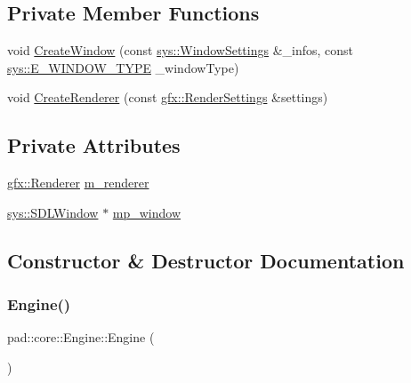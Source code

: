 \subsection*{Private Member Functions}
\begin{DoxyCompactItemize}
\item 
void \mbox{\hyperlink{classpad_1_1core_1_1_engine_a502a6d0e29f045da8b04020947ed8722}{Create\+Window}} (const \mbox{\hyperlink{structpad_1_1sys_1_1_window_settings}{sys\+::\+Window\+Settings}} \&\+\_\+infos, const \mbox{\hyperlink{namespacepad_1_1sys_a33417a3109944d4ec323bc85137e4ea4}{sys\+::\+E\+\_\+\+W\+I\+N\+D\+O\+W\+\_\+\+T\+Y\+PE}} \+\_\+window\+Type)
\item 
void \mbox{\hyperlink{classpad_1_1core_1_1_engine_a093e75eca0488cd579e55e4e258d8266}{Create\+Renderer}} (const \mbox{\hyperlink{structpad_1_1gfx_1_1_render_settings}{gfx\+::\+Render\+Settings}} \&settings)
\end{DoxyCompactItemize}
\subsection*{Private Attributes}
\begin{DoxyCompactItemize}
\item 
\mbox{\hyperlink{classpad_1_1gfx_1_1_renderer}{gfx\+::\+Renderer}} \mbox{\hyperlink{classpad_1_1core_1_1_engine_a304fd19fdc472d1e2110220e31eaea96}{m\+\_\+renderer}}
\item 
\mbox{\hyperlink{classpad_1_1sys_1_1_s_d_l_window}{sys\+::\+S\+D\+L\+Window}} $\ast$ \mbox{\hyperlink{classpad_1_1core_1_1_engine_a2ddf54acc2363098189237cf48ab504c}{mp\+\_\+window}}
\end{DoxyCompactItemize}


\subsection{Constructor \& Destructor Documentation}
\mbox{\label{classpad_1_1core_1_1_engine_a21cbbda47294efd9577f2326e296987d}} 
\subsubsection{\texorpdfstring{Engine()}{Engine()}\hspace{0.1cm}{\footnotesize\ttfamily [1/3]}}
{\footnotesize\ttfamily pad\+::core\+::\+Engine\+::\+Engine (\begin{DoxyParamCaption}{ }\end{DoxyParamCaption})}

